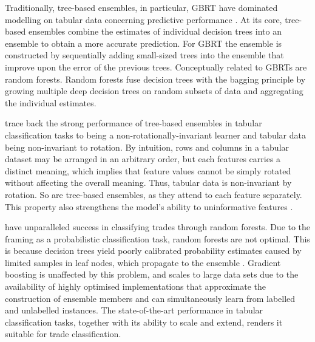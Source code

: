 Traditionally, tree-based ensembles, in particular, \gls{GBRT} have dominated modelling on tabular data concerning predictive performance \autocites[][24--25]{grinsztajnWhyTreebasedModels2022}[][7]{kadraWelltunedSimpleNets2021}[][8]{gorishniyRevisitingDeepLearning2021}. At its core, tree-based ensembles combine the estimates of individual decision trees into an ensemble to obtain a more accurate prediction. For \gls{GBRT} \autocite[][9]{friedmanGreedyFunctionApproximation2001} the ensemble is constructed by sequentially adding small-sized trees into the ensemble that improve upon the error of the previous trees. Conceptually related to \glspl{GBRT} are random forests. Random forests \autocite[][6]{breimanRandomForests2001} fuse decision trees with the bagging principle \autocite[][123]{breimanBaggingPredictors1996} by growing multiple deep decision trees on random subsets of data and aggregating the individual estimates. 

\textcite[][7-9]{grinsztajnWhyTreebasedModels2022} trace back the strong performance of tree-based ensembles in tabular classification tasks to being a non-rotationally-invariant learner and tabular data being non-invariant to rotation. By intuition, rows and columns in a tabular dataset may be arranged in an arbitrary order, but each features carries a distinct meaning, which implies that feature values cannot be simply rotated without affecting the overall meaning. Thus, tabular data is non-invariant by rotation. So are tree-based ensembles, as they attend to each feature separately. This property also strengthens the model's ability to uninformative features \autocite[][8-9]{grinsztajnWhyTreebasedModels2022}.

\textcite[][13--14]{ronenMachineLearningTrade2022} have unparalleled success in classifying trades through random forests. Due to the framing as a probabilistic classification task, random forests are not optimal. This is because decision trees yield poorly calibrated probability estimates caused by limited samples in leaf nodes, which propagate to the ensemble \autocite[][356--360]{tanhaSemisupervisedSelftrainingDecision2017}. Gradient boosting is unaffected by this problem, and scales to large data sets due to the availability of highly optimised implementations that approximate the construction of ensemble members and can simultaneously learn from labelled and unlabelled instances. The state-of-the-art performance in tabular classification tasks, together with its ability to scale and extend, renders it suitable for trade classification.


